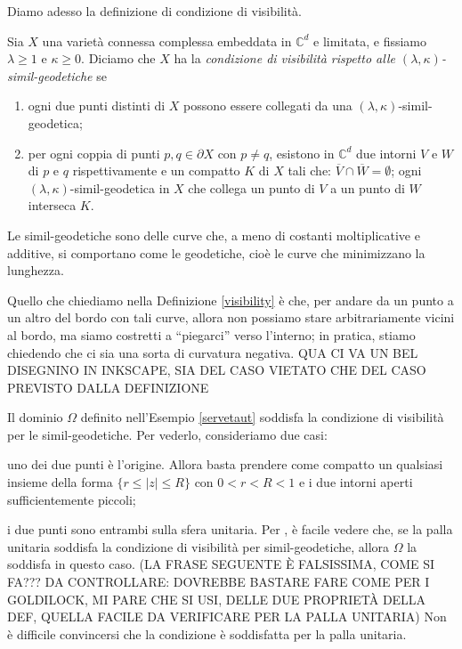 Diamo adesso la definizione di condizione di visibilità.

\begin{defn} \label{visibility}
    Sia $X$ una varietà connessa complessa embeddata in $\mathbb{C}^d$ e limitata, e fissiamo $\lambda \ge 1$ e $\kappa \ge 0$. Diciamo che $X$ ha la \textit{condizione di visibilità rispetto alle $(\lambda,\kappa)$-simil-geodetiche} se
    \begin{enumerate}
        \item ogni due punti distinti di $X$ possono essere collegati da una $(\lambda,\kappa)$-simil-geodetica;
        \item per ogni coppia di punti $p,q\in\partial X$ con $p\not=q$, esistono in $\mathbb{C}^d$ due intorni $V$ e $W$ di $p$ e $q$ rispettivamente e un compatto $K$ di $X$ tali che: $\overline{V}\cap\overline{W}=\emptyset$; ogni $(\lambda,\kappa)$-simil-geodetica in $X$ che collega un punto di $V$ a un punto di $W$ interseca $K$.
    \end{enumerate}
\end{defn}

Le simil-geodetiche sono delle curve che, a meno di costanti moltiplicative e additive, si comportano come le geodetiche, cioè le curve che minimizzano la lunghezza.

Quello che chiediamo nella Definizione \ref{visibility} è che, per andare da un punto a un altro del bordo con tali curve, allora non possiamo stare arbitrariamente vicini al bordo, ma siamo costretti a ``piegarci'' verso l'interno; in pratica, stiamo chiedendo che ci sia una sorta di curvatura negativa. QUA CI VA UN BEL DISEGNINO IN INKSCAPE, SIA DEL CASO VIETATO CHE DEL CASO PREVISTO DALLA DEFINIZIONE

\begin{ftt}
    Il dominio $\Omega$ definito nell'Esempio \ref{servetaut} soddisfa la condizione di visibilità per le simil-geodetiche. Per vederlo, consideriamo due casi:
    \begin{nlist}
        \item uno dei due punti è l'origine. Allora basta prendere come compatto un qualsiasi insieme della forma $\{r \le |z| \le R\}$ con $0<r<R<1$ e i due intorni aperti sufficientemente piccoli;
        \item i due punti sono entrambi sulla sfera unitaria. Per \cite[Proposition 6]{NTT}, è facile vedere che, se la palla unitaria soddisfa la condizione di visibilità per simil-geodetiche, allora $\Omega$ la soddisfa in questo caso. (LA FRASE SEGUENTE È FALSISSIMA, COME SI FA??? DA CONTROLLARE: DOVREBBE BASTARE FARE COME PER I GOLDILOCK, MI PARE CHE SI USI, DELLE DUE PROPRIETÀ DELLA DEF, QUELLA FACILE DA VERIFICARE PER LA PALLA UNITARIA) Non è difficile convincersi che la condizione è soddisfatta per la palla unitaria.
    \end{nlist}
\end{ftt}